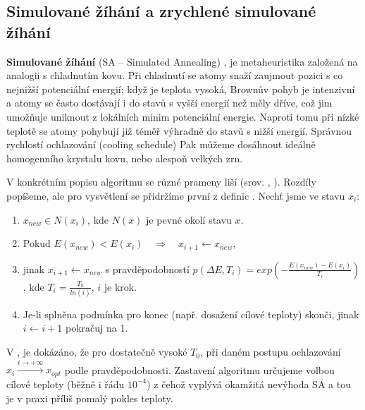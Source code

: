 \subsection{Simulované žíhání a zrychlené simulované žíhání}

\textbf{Simulované žíhání} (SA -- Simulated Annealing) \cite{SA Hajek}, \cite{SA Tsitsiklis} je metaheuristika založená na analogii s chladnutím kovu. Při chladnutí se atomy snaží zaujmout pozici s co nejnižší potenciální energií; když je teplota vysoká, Brownův pohyb je intenzivní a atomy se často dostávají i do stavů s vyšší energií než měly dříve, což jim umožňuje uniknout z lokálních minim potenciální energie. Naproti tomu při nízké teplotě se atomy pohybují již téměř výhradně do stavů s nižší energií. Správnou rychlostí ochlazování (cooling schedule) Pak můžeme dosáhnout ideálně homogenního krystalu kovu, nebo alespoň velkých zrn.

V konkrétním popisu algoritmu se různé prameny liší (srov. \cite{SA Hajek}, \cite{VFSA}). Rozdíly popíšeme, ale pro vysvětlení se přidržíme první z definic . Nechť jsme ve stavu $x_i$:
\begin{enumerate}
  \item $x_{new} \in N(x_i)$, kde $N(x)$ je pevné okolí stavu $x$.
  \item Pokud $E(x_{new}) < E(x_i) \quad\Rightarrow\quad x_{i+1} \leftarrow x_{new}$,
  \item jinak $x_{i+1} \leftarrow x_{new}$ s pravděpodobností $p(\Delta E,T_i) = exp(-\frac{E(x_{new}) - E(x_i)}{T_i})$,
    \newline kde $T_i = \frac{T_0}{ln(i)}$, $i$ je krok.
  \item Je-li splněna podmínka pro konec (např. dosažení cílové teploty) skonči, jinak \linebreak $i\leftarrow i+1$ pokračuj na 1.
\end{enumerate}


V \cite{SA Hajek}, \cite{SA Tsitsiklis} je dokázáno, že pro dostatečně vysoké $T_0$, při daném postupu ochlazování $x_i \xrightarrow{i \to +\infty} x_{opt}$ podle pravděpodobnosti. Zastavení algoritmu určujeme volbou cílové teploty (běžně i řádu $10^{-4}$) z čehož vyplývá okamžitá nevýhoda SA a tou je v praxi příliš pomalý pokles teploty.

